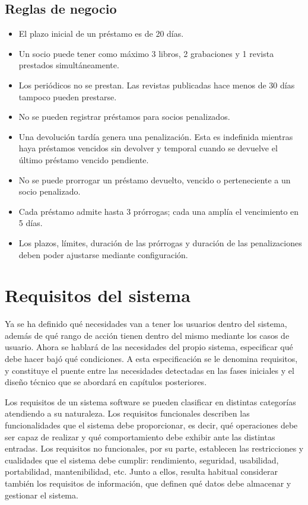 \subsection{Reglas de negocio}
\begin{itemize}
	\item El plazo inicial de un préstamo es de 20 días.
	\item Un socio puede tener como máximo 3 libros, 2 grabaciones y 1 revista prestados simultáneamente.
	\item Los periódicos no se prestan. Las revistas publicadas hace menos de 30 días tampoco pueden prestarse.
	\item No se pueden registrar préstamos para socios penalizados.
	\item Una devolución tardía genera una penalización. Esta es indefinida mientras haya préstamos vencidos sin devolver y temporal cuando se devuelve el último préstamo vencido pendiente.
	\item No se puede prorrogar un préstamo devuelto, vencido o perteneciente a un socio penalizado.
	\item Cada préstamo admite hasta 3 prórrogas; cada una amplía el vencimiento en 5 días.
	\item Los plazos, límites, duración de las prórrogas y duración de las penalizaciones deben poder ajustarse mediante configuración.
\end{itemize}

\section{Requisitos del sistema}

Ya se ha definido qué necesidades van a tener los usuarios dentro del sistema, además de qué rango de acción tienen dentro del mismo mediante los casos de usuario. Ahora se hablará de las necesidades del propio sistema, especificar qué debe hacer bajó qué condiciones. A esta especificación se le denomina requisitos, y constituye el puente entre las necesidades detectadas en las fases iniciales y el diseño técnico que se abordará en capítulos posteriores.

Los requisitos de un sistema software se pueden clasificar en distintas categorías atendiendo a su naturaleza. Los requisitos funcionales describen las funcionalidades que el sistema debe proporcionar, es decir, qué operaciones debe ser capaz de realizar y qué comportamiento debe exhibir ante las distintas entradas. Los requisitos no funcionales, por su parte, establecen las restricciones y cualidades que el sistema debe cumplir: rendimiento, seguridad, usabilidad, portabilidad, mantenibilidad, etc. Junto a ellos, resulta habitual considerar también los requisitos de información, que definen qué datos debe almacenar y gestionar el sistema.


